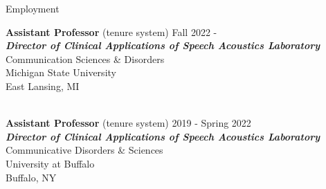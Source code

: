 \documentclass{resume} %
\begin{document}

\begin{flushleft}
  \hfill
\end{flushleft}







\begin{rSection}{Employment}

{{\bf Assistant Professor} (tenure system)} \hfill {Fall 2022 - } \\
\emph{\bf{Director of Clinical Applications of Speech Acoustics Laboratory}}\\
Communication Sciences \& Disorders \\
Michigan State University \\
East Lansing, MI

\bigskip \\

{{\bf Assistant Professor} (tenure system)} \hfill {2019 - Spring 2022} \\
\emph{\bf{Director of Clinical Applications of Speech Acoustics Laboratory}}\\
Communicative Disorders \& Sciences \\
University at Buffalo \\
Buffalo, NY


\end{rSection}
\end{document}
